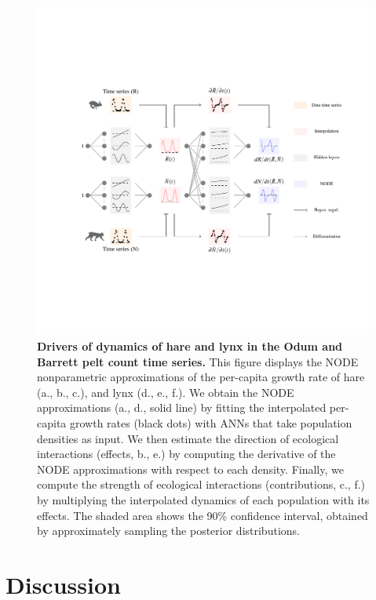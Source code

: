 \documentclass[11pt, oneside]{article}
\begin{document}
\newpage
\begin{figure}[H]
\begin{center}
\includegraphics[width=\linewidth,page=4]{figures/main.pdf}
\caption{
    \textbf{Drivers of dynamics of hare and lynx in the Odum and Barrett pelt count time series.}
    This figure displays the NODE nonparametric approximations of the per-capita growth rate of hare (a., b., c.), and lynx (d., e., f.).
    We obtain the NODE approximations (a., d., solid line) by fitting the interpolated per-capita growth rates (black dots) with ANNs that take population densities as input.
    We then estimate the direction of ecological interactions (effects, b., e.) by computing the derivative of the NODE approximations with respect to each density.
    Finally, we compute the strength of ecological interactions (contributions, c., f.) by multiplying the interpolated dynamics of each population with its effects.
    The shaded area shows the 90\% confidence interval, obtained by approximately sampling the posterior distributions. 
}
\end{center}
\end{figure}
\newpage

\section{Discussion}
\end{document}
